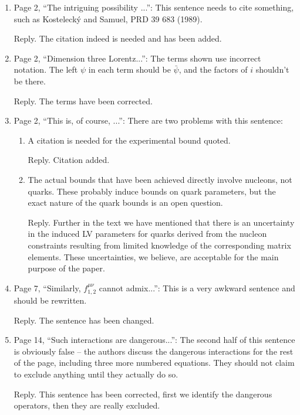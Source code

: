 \documentclass[12pt,preprintnumbers,nofootinbib]{revtex4}
\begin{document}
\begin{enumerate}
\item Page 2, ``The intriguing possibility ...'':
 This sentence needs to cite something,
 such as Kosteleck\'y and Samuel, PRD 39 683 (1989).

Reply. The citation indeed is needed and has been added.

\item Page 2, ``Dimension three Lorentz...'':
 The terms shown use incorrect notation.
 The left $\psi$ in each term should be $\bar{\psi}$,
 and the factors of $i$ shouldn't be there.

Reply. The terms have been corrected.


\item Page 2, ``This is, of course, ...'':
 There are two problems with this sentence:
 \begin{enumerate}
 \item A citation is needed for the experimental bound quoted.

Reply. Citation added. 

 \item The actual bounds that have been achieved directly involve nucleons, not
quarks.
 These probably induce bounds on quark parameters,
 but the exact nature of the quark bounds is an open question.

Reply. Further in the text we have mentioned that there is an
uncertainty in the induced LV parameters for quarks derived from the
nucleon constraints resulting from limited knowledge of the 
corresponding matrix elements. These uncertainties, we believe, are
acceptable for the main purpose of the paper.
 \end{enumerate}

\item Page 7, ``Similarly, $f_{1,2}^{\mu\nu}$ cannot admix...'':
 This is a very awkward sentence and should be rewritten.

Reply. The sentence has been changed.

\item Page 14, ``Such interactions are dangerous...'':
 The second half of this sentence is obviously false --
 the authors discuss the dangerous interactions for the rest of the page,
 including three more numbered equations.
 They should not claim to exclude anything until they actually do so.

Reply. This sentence has been corrected, first we identify the dangerous
operators, then they are really excluded.


\end{enumerate}
\end{document}
